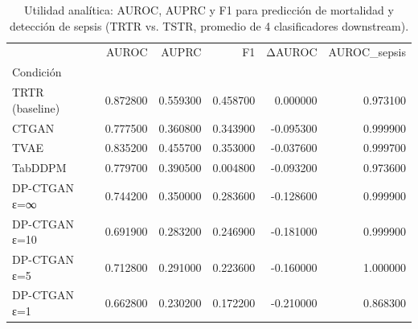\begin{table}
\caption{Utilidad analítica: AUROC, AUPRC y F1 para predicción de mortalidad y detección de sepsis (TRTR vs. TSTR, promedio de 4 clasificadores downstream).}
\label{tab:utilidad_summary}
\begin{tabular}{lrrrrr}
\toprule
 & AUROC & AUPRC & F1 & ΔAUROC & AUROC\_sepsis \\
Condición &  &  &  &  &  \\
\midrule
TRTR (baseline) & 0.872800 & 0.559300 & 0.458700 & 0.000000 & 0.973100 \\
CTGAN & 0.777500 & 0.360800 & 0.343900 & -0.095300 & 0.999900 \\
TVAE & 0.835200 & 0.455700 & 0.353000 & -0.037600 & 0.999700 \\
TabDDPM & 0.779700 & 0.390500 & 0.004800 & -0.093200 & 0.973600 \\
DP-CTGAN ε=∞ & 0.744200 & 0.350000 & 0.283600 & -0.128600 & 0.999900 \\
DP-CTGAN ε=10 & 0.691900 & 0.283200 & 0.246900 & -0.181000 & 0.999900 \\
DP-CTGAN ε=5 & 0.712800 & 0.291000 & 0.223600 & -0.160000 & 1.000000 \\
DP-CTGAN ε=1 & 0.662800 & 0.230200 & 0.172200 & -0.210000 & 0.868300 \\
\bottomrule
\end{tabular}
\end{table}
